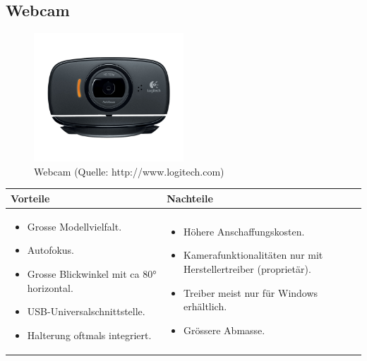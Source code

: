 \pagebreak

\subsection{Webcam}

\begin{figure}[h!]%
\centering
\includegraphics[width=0.5\textwidth]{fig/hd-webcam-c525-gallery.png}
\caption{Webcam (Quelle: http://www.logitech.com)}
\label{fig:Webcam}
\end{figure}

\begin{table}[h]
\begin{tabular}{p{} | p{}}


 \textbf{Vorteile} & \textbf{Nachteile} \\ \hline
	 
\begin{itemize}
\item Grosse Modellvielfalt.
\item Autofokus.
\item Grosse Blickwinkel mit ca 80° horizontal.
\item USB-Universalschnittstelle.
\item Halterung oftmals integriert.
\end{itemize}

 
 &
 
\begin{itemize}
\item Höhere Anschaffungskosten.
\item Kamerafunktionalitäten nur mit Herstellertreiber (proprietär).
\item Treiber meist nur für Windows erhältlich.
\item Grössere Abmasse.
\end{itemize}

\end{tabular}
\end{table}

